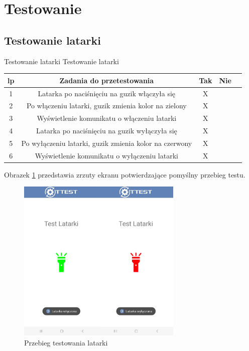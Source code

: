 	\newpage
\section{Testowanie}	%

\subsection{Testowanie latarki}

\begin{tabela}
	{Testowanie latarki}	%
	{Testowanie latarki}	%
	{
		\begin{tabular}{|c|c|c|c|c|} \hline
			\textbf{lp} & \textbf{Zadania do przetestowania} & \textbf{Tak} & \textbf{Nie} \\ \hline
			1 & Latarka po naciśnięciu na guzik włączyła się & X & ~ \\ \hline
			2 & Po włączeniu latarki, guzik zmienia kolor na zielony & X & ~ \\ \hline
			3 & Wyświetlenie komunikatu o włączeniu latarki & X & ~ \\ \hline
			4 & Latarka po naciśnięciu na guzik wyłączyła się & X & ~ \\ \hline
			5 & Po wyłączeniu latarki, guzik zmienia kolor na czerwony & X & ~ \\ \hline
			6 & Wyświetlenie komunikatu o wyłączeniu latarki & X & ~ \\ \hline
		\end{tabular}	}
	\label{tab:tablica_latarka}
\end{tabela}

Obrazek \ref{rys:latarka} przedstawia zrzuty ekranu potwierdzające pomyślny przebieg testu.

\begin{figure}[!hbt]
	\begin{center}
		\includegraphics[angle=360, width=0.70\textwidth]{rys/punkt5/latarka.jpg}
		\caption{Przebieg testowania latarki}
		\label{rys:latarka}
	\end{center}
\end{figure}   

